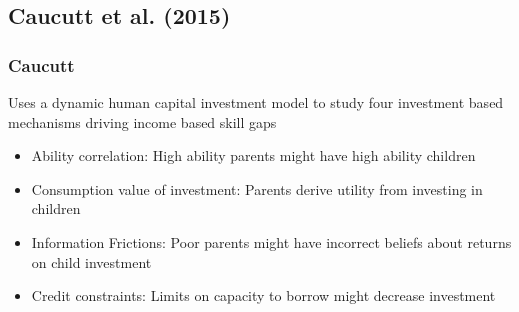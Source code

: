 \documentclass{beamer}
\begin{document}





\subsection{Caucutt et al. (2015)} 

\begin{frame}
\frametitle{Caucutt}
Uses a dynamic human capital investment model to study four investment based mechanisms driving income based skill gaps 

\begin{itemize}
\item Ability correlation: High ability parents might have high ability children 
\item Consumption value of investment: Parents derive utility from investing in children
\item Information Frictions: Poor parents might have incorrect beliefs about returns on child investment
\item Credit constraints: Limits on capacity to borrow might decrease investment
\end{itemize}
\end{frame}
\end{document}
